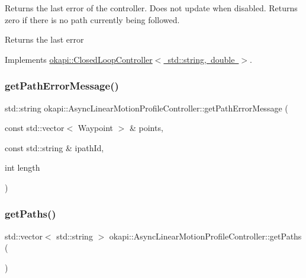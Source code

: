 Returns the last error of the controller. Does not update when disabled. Returns zero if there is no path currently being followed.

\begin{DoxyReturn}{Returns}
the last error 
\end{DoxyReturn}


Implements \mbox{\hyperlink{classokapi_1_1ClosedLoopController_a50c73444ff6e3e631951c43d0f951953}{okapi\+::\+Closed\+Loop\+Controller$<$ std\+::string, double $>$}}.

\mbox{\label{classokapi_1_1AsyncLinearMotionProfileController_a6778fc13018167cec6cccfa6abf7a0ad}} 
\subsubsection{\texorpdfstring{getPathErrorMessage()}{getPathErrorMessage()}}
{\footnotesize\ttfamily std\+::string okapi\+::\+Async\+Linear\+Motion\+Profile\+Controller\+::get\+Path\+Error\+Message (\begin{DoxyParamCaption}\item[{const std\+::vector$<$ Waypoint $>$ \&}]{points,  }\item[{const std\+::string \&}]{ipath\+Id,  }\item[{int}]{length }\end{DoxyParamCaption})\hspace{0.3cm}{\ttfamily [protected]}}

\mbox{\label{classokapi_1_1AsyncLinearMotionProfileController_ac8495348b177b54bc2978c8b2a27dd4e}} 
\subsubsection{\texorpdfstring{getPaths()}{getPaths()}}
{\footnotesize\ttfamily std\+::vector$<$ std\+::string $>$ okapi\+::\+Async\+Linear\+Motion\+Profile\+Controller\+::get\+Paths (\begin{DoxyParamCaption}{ }\end{DoxyParamCaption})}

